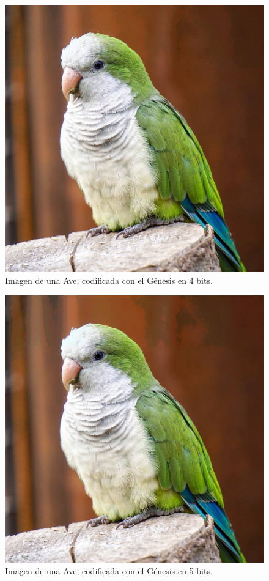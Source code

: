 \documentclass[conference]{IEEEtran}
\begin{document}
    \begin{figure}[H]
    \centering
    \includegraphics[width=0.9\linewidth]{image/birb4.png}
\caption{Imagen de una Ave, codificada con el Génesis en 4 bits.}
\end{figure}

    \begin{figure}[H]
    \centering
    \includegraphics[width=0.9\linewidth]{image/birb5.png}
\caption{Imagen de una Ave, codificada con el Génesis en 5 bits.}
\end{figure}
\end{document}
